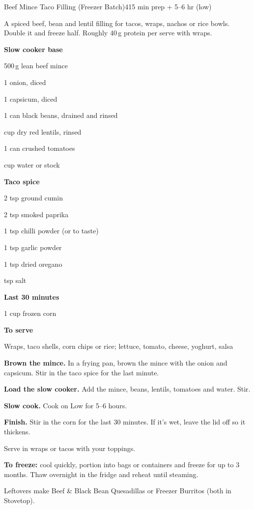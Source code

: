 \begin{recipebox}{Beef Mince Taco Filling (Freezer Batch)}{4}{15 min prep + 5--6 hr (low)}

A spiced beef, bean and lentil filling for tacos, wraps, nachos or rice bowls.
Double it and freeze half. Roughly 40\,g protein per serve with wraps.

\begin{ingredients}
  \item[] \textbf{Slow cooker base}
  \item 500\,g lean beef mince
  \item 1 onion, diced
  \item 1 capsicum, diced
  \item 1 can black beans, drained and rinsed
  \item {} cup dry red lentils, rinsed
  \item 1 can crushed tomatoes
  \item {} cup water or stock
  \item[] \textbf{Taco spice}
  \item 2 tsp ground cumin
  \item 2 tsp smoked paprika
  \item 1 tsp chilli powder (or to taste)
  \item 1 tsp garlic powder
  \item 1 tsp dried oregano
  \item {} tsp salt
  \item[] \textbf{Last 30 minutes}
  \item 1 cup frozen corn
  \item[] \textbf{To serve}
  \item Wraps, taco shells, corn chips or rice; lettuce, tomato, cheese, yoghurt, salsa
\end{ingredients}

\begin{method}
  \item \textbf{Brown the mince.} In a frying pan, brown the mince with the onion and capsicum. Stir in the taco spice for the last minute.
  \item \textbf{Load the slow cooker.} Add the mince, beans, lentils, tomatoes and water. Stir.
  \item \textbf{Slow cook.} Cook on Low for 5--6 hours.
  \item \textbf{Finish.} Stir in the corn for the last 30 minutes. If it's wet, leave the lid off so it thickens.
  \item Serve in wraps or tacos with your toppings.
\end{method}

\begin{notelist}
  \item \textbf{To freeze:} cool quickly, portion into bags or containers and freeze for up to 3 months. Thaw overnight in the fridge and reheat until steaming.
  \item Leftovers make Beef \& Black Bean Quesadillas or Freezer Burritos (both in Stovetop).
\end{notelist}

\end{recipebox}
